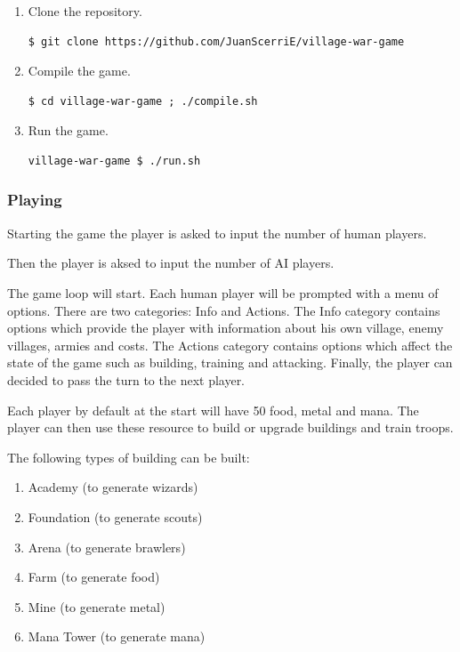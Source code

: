 \documentclass[12pt]{article}
\begin{document}
\begin{enumerate}
\item
    Clone the repository.
\begin{lstlisting}
$ git clone https://github.com/JuanScerriE/village-war-game
\end{lstlisting}

\item
    Compile the game.
\begin{lstlisting}
$ cd village-war-game ; ./compile.sh
\end{lstlisting}

\item
    Run the game.
\begin{lstlisting}
village-war-game $ ./run.sh
\end{lstlisting}

\end{enumerate}

\subsubsection{Playing}


Starting the game the player is asked to input the number of
human players.


Then the player is aksed to input the number of AI players.


The game loop will start. Each human player will be prompted
with a menu of options. There are two categories: Info and
Actions. The Info category contains options which provide the
player with information about his own village, enemy villages,
armies and costs. The Actions category contains options which
affect the state of the game such as building, training and
attacking. Finally, the player can decided to pass the turn to
the next player.

Each player by default at the start will have 50 food, metal and
mana. The player can then use these resource to build or upgrade
buildings and train troops.

The following types of building can be built:

\begin{enumerate}
    \item Academy (to generate wizards)
    \item Foundation (to generate scouts)
    \item Arena (to generate brawlers)
    \item Farm (to generate food)
    \item Mine (to generate metal)
    \item Mana Tower (to generate mana)
\end{enumerate}
\end{document}
